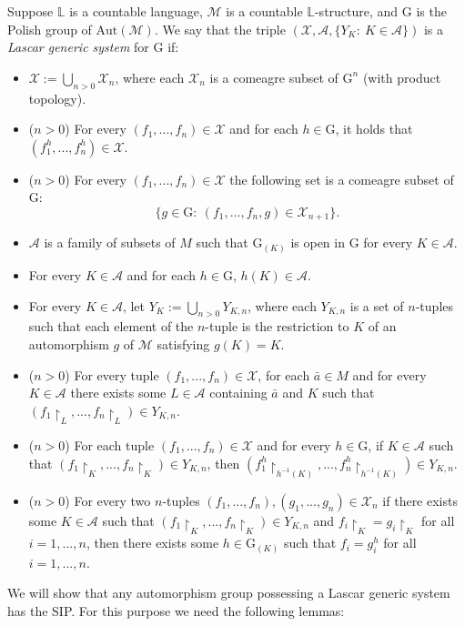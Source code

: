 \documentclass[11pt]{article}
\theoremstyle{plain}
\theoremstyle{definition}
\newcommand{\M}{\mathcal{M}}
\newcommand{\G}{\mathrm{G}}
\newcommand{\A}{\mathrm{Aut}}
\begin{document}
Suppose $\mathbb{L}$ is a countable language,  $\M$ is a countable $\mathbb{L}$-structure, and $\G$ is the  Polish group of $\A(\M)$. We say that the triple $(\mathcal{X},\mathcal{A},\{Y_{K}: \ K\in\mathcal{A}\})$ is a\textit{ Lascar generic system} for $\G$ if:
\begin{itemize}
	\item[(1)] $\mathcal{X}:=\bigcup_{n>0}\mathcal{X}_{n}$, where each $\mathcal{X}_{n} $ is a comeagre subset of $\G^{n}$ (with product topology).
	 \item[(2)]   ($n>0$) For every $(f_{1},...,f_{n})\in\mathcal{X} $ and for each  $h\in\G$, it holds that $(f_{1}^{h},...,f_{n}^{h})\in\mathcal{X} $.
	\item[(3)]  ($n>0$) For every $(f_{1},...,f_{n})\in \mathcal{X}$ the following set is a comeagre subset of $\G$:
	$$\{g\in \G: \ (f_{1},...,f_{n},g)\in \mathcal{X}_{n+1}\}. $$
	\item[(4)] $\mathcal{A}$ is a family of subsets of $M$ such that $\G_{(K)}$ is open in $\G$ for every $K\in\mathcal{A}$.
	\item[(5)] For every $K\in\mathcal{A}$ and for each $h\in \G$, $h(K)\in\mathcal{A}$.
	\item[(6)] For every $K \in \mathcal{A}$, let $Y_K := \bigcup_{n >0} Y_{K,n}$, where each $Y_{K,n}$ is a set of $n$-tuples such that each element of the $n$-tuple is the restriction to $K$ of an automorphism $g$ of $\M$ satisfying $g(K) = K$.
	\item[(7)]  ($n>0$) For every tuple $(f_{1},...,f_{n})\in\mathcal{X} $, for each  $\bar{a}\in M$ and for every $K\in\mathcal{A}$ there exists some $L\in \mathcal{A}$ containing $\bar{a}$ and $K$ such that $(f_{1}\upharpoonright_{L},...,f_{n}\upharpoonright_{L})\in Y_{K,n} $.
	 \item[(8)]  ($n>0$) For each tuple $(f_{1},...,f_{n})\in\mathcal{X} $ and for every  $h\in\G$, if $K\in \mathcal{A}$ such that ${(f_{1}\upharpoonright_{K},...,f_{n}\upharpoonright_{K})\in Y_{K,n}}$, then $(f_{1}^{h}\upharpoonright_{h^{-1}(K)},...,f_{n}^{h}\upharpoonright_{h^{-1}(K)})\in Y_{K,n}$.
	\item[(9)]  ($n>0$) For every two $n$-tuples $(f_{1},...,f_{n}),(g_{1},...,g_{n})\in \mathcal{X}_{n}$ if there exists some $K\in\mathcal{A}$ such that $(f_{1}\upharpoonright_{K},...,f_{n}\upharpoonright_{K})\in Y_{K,n}$ and $f_{i}\upharpoonright_{K}=g_{i}\upharpoonright_{K}$
 for all $i=1,...,n$, then there exists some $h\in\G_{(K)}$ such that $f_{i}=g_{i}^{h}$ for all  $i=1,...,n$.
\end{itemize}
 We will show that any automorphism group possessing a Lascar generic system has the SIP. For this purpose we need the following lemmas:
 
\end{document}
